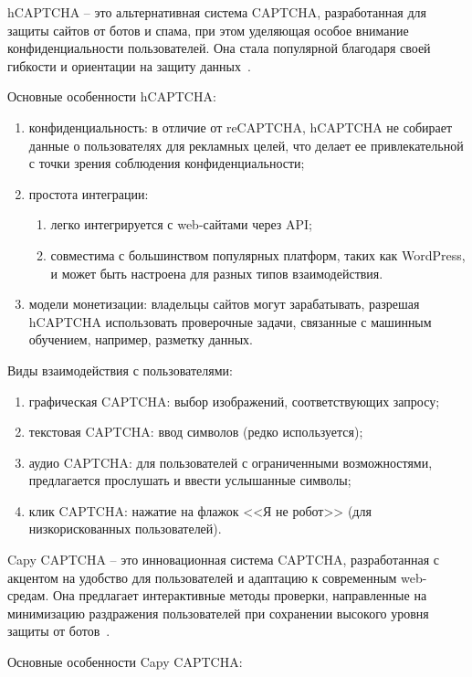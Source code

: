 hCAPTCHA -- это альтернативная система CAPTCHA, разработанная для защиты сайтов 
от ботов и спама, при этом уделяющая особое внимание конфиденциальности 
пользователей. Она стала популярной благодаря своей гибкости и ориентации на 
защиту данных~\cite{hcaptcha}.

Основные особенности hCAPTCHA:

\begin{enumerate}
    \item конфиденциальность: в отличие от reCAPTCHA, hCAPTCHA не собирает данные 
    о пользователях для рекламных целей, что делает ее привлекательной с точки 
    зрения соблюдения конфиденциальности;
    \item простота интеграции:
    \begin{enumerate}
        \item легко интегрируется с web-сайтами через API;
        \item совместима с большинством популярных платформ, таких как WordPress, 
        и может быть настроена для разных типов взаимодействия.
    \end{enumerate}
    \item модели монетизации: владельцы сайтов могут зарабатывать, разрешая 
    hCAPTCHA использовать проверочные задачи, связанные с машинным обучением, 
    например, разметку данных.
\end{enumerate}

Виды взаимодействия с пользователями:

\begin{enumerate}
    \item графическая CAPTCHA: выбор изображений, соответствующих запросу;
    \item текстовая CAPTCHA: ввод символов (редко используется);
    \item аудио CAPTCHA: для пользователей с ограниченными возможностями, 
    предлагается прослушать и ввести услышанные символы;
    \item клик CAPTCHA: нажатие на флажок <<Я не робот>> (для низкорискованных 
    пользователей).
\end{enumerate}

Capy CAPTCHA -- это инновационная система CAPTCHA, разработанная с акцентом на 
удобство для пользователей и адаптацию к современным web-средам. Она предлагает 
интерактивные методы проверки, направленные на минимизацию раздражения 
пользователей при сохранении высокого уровня защиты от ботов~\cite{capy}.

Основные особенности Capy CAPTCHA:

